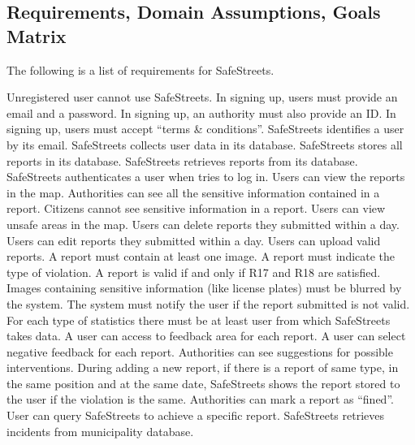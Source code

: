 \documentclass[../RASD.tex]{subfiles}
\begin{document}
            \subsection{Requirements, Domain Assumptions, Goals Matrix}\label{subsec:requirements,-domain-assumptions,-goals-matrix}
                The following is a list of requirements for SafeStreets.
                \begin{enumerate}
                     Unregistered user cannot use SafeStreets.
                     In signing up, users must provide an email and a password.
                     In signing up, an authority must also provide an ID.
                     In signing up, users must accept “terms \& conditions”.
                     SafeStreets identifies a user by its email.
                     SafeStreets collects user data in its database.
                     SafeStreets stores all reports in its database.
                     SafeStreets retrieves reports from its database.
                     SafeStreets authenticates a user when tries to log in.
                     Users can view the reports in the map.
                     Authorities can see all the sensitive information contained in a report.
                     Citizens cannot see sensitive information in a report.
                     Users can view unsafe areas in the map.
                     Users can delete reports they submitted within a day.
                     Users can edit reports they submitted within a day.
                     Users can upload valid reports.
                     A report must contain at least one image.
                     A report must indicate the type of violation.
                     A report is valid if and only if R17 and R18 are satisfied.
                     Images containing sensitive information (like license plates) must be blurred by the system.
                     The system must notify the user if the report submitted is not valid.
                     For each type of statistics there must be at least user from which SafeStreets takes data.
                     A user can access to feedback area for each report.
                     A user can select negative feedback for each report.
                     Authorities can see suggestions for possible interventions.
                     During adding a new report, if there is a report of same type, in the same position and at the same date, SafeStreets shows the report stored to the user if the violation is the same.
                     Authorities can mark a report as “fined”.
                     User can query SafeStreets to achieve a specific report.
                     SafeStreets retrieves incidents from municipality database.
                \end{enumerate}
\end{document}
